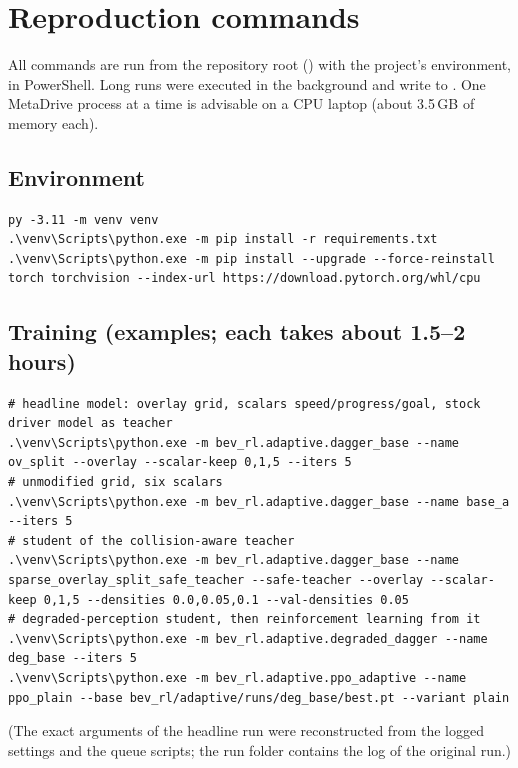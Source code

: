 \section{Reproduction commands}\label{app:commands}

All commands are run from the repository root () with the project's environment, in PowerShell. Long runs were executed in the background and write to . One MetaDrive process at a time is advisable on a CPU laptop (about 3.5\,GB of memory each).

\subsection{Environment}
\begin{lstlisting}
py -3.11 -m venv venv
.\venv\Scripts\python.exe -m pip install -r requirements.txt
.\venv\Scripts\python.exe -m pip install --upgrade --force-reinstall torch torchvision --index-url https://download.pytorch.org/whl/cpu
\end{lstlisting}

\subsection{Training (examples; each takes about 1.5--2 hours)}
\begin{lstlisting}
# headline model: overlay grid, scalars speed/progress/goal, stock driver model as teacher
.\venv\Scripts\python.exe -m bev_rl.adaptive.dagger_base --name ov_split --overlay --scalar-keep 0,1,5 --iters 5
# unmodified grid, six scalars
.\venv\Scripts\python.exe -m bev_rl.adaptive.dagger_base --name base_a --iters 5
# student of the collision-aware teacher
.\venv\Scripts\python.exe -m bev_rl.adaptive.dagger_base --name sparse_overlay_split_safe_teacher --safe-teacher --overlay --scalar-keep 0,1,5 --densities 0.0,0.05,0.1 --val-densities 0.05
# degraded-perception student, then reinforcement learning from it
.\venv\Scripts\python.exe -m bev_rl.adaptive.degraded_dagger --name deg_base --iters 5
.\venv\Scripts\python.exe -m bev_rl.adaptive.ppo_adaptive --name ppo_plain --base bev_rl/adaptive/runs/deg_base/best.pt --variant plain
\end{lstlisting}
(The exact arguments of the headline run were reconstructed from the logged settings and the queue scripts; the run folder  contains the log of the original run.)


